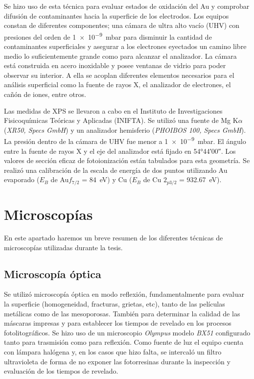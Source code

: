 		Se hizo uso de esta técnica para evaluar estados de oxidación del Au y comprobar difusión de contaminantes hacia la superficie de los electrodos.  Los equipos constan de diferentes componentes; una cámara de ultra alto vacío (UHV) con presiones del orden de \SI{1e-9}{mbar} para disminuir la cantidad de contaminantes superficiales y asegurar a los electrones eyectados un camino libre medio lo suficientemente grande como para alcanzar el analizador. La cámara está construida en acero inoxidable y posee ventanas de vidrio para poder observar su interior. A ella se acoplan diferentes elementos necesarios para el análisis superficial como la fuente de rayos X, el analizador de electrones, el cañón de iones, entre otros.\cite{XPS1978,Corthey2012}

		Las medidas de XPS se llevaron a cabo en el Instituto de Investigaciones Fisicoquímicas Teóricas y Aplicadas (INIFTA). Se utilizó una fuente de Mg K$\alpha$ (\textit{XR50, Specs GmbH}) y un analizador hemisferio (\textit{PHOIBOS 100, Specs GmbH}). La presión dentro de la cámara de UHV fue menor a \SI{1e-9}{mbar}. El ángulo entre la fuente de rayos X y el eje del analizador está fijado en \ang{54;44;00}. Los valores de sección eficaz de fotoionización están tabulados para esta geometría. Se realizó una calibración de la escala de energía de dos puntos utilizando Au evaporado ($E_B$ de Au$f_{7/2}$ = \SI{84}{\electronvolt}) y Cu ($E_B$ de Cu $2_{p3/2}$ = \SI{932.67}{\electronvolt}).
		
\vspace*{-0.2cm}\section{Microscopías}\label{sec:micros}
		
	 En este apartado haremos un breve resumen de los diferentes técnicas de microscopías utilizadas durante la tesis.

	\subsection{Microscopía óptica}

		Se utilizó microscopía óptica en modo reflexión, fundamentalmente para evaluar la superficie (homogeneidad, fracturas, grietas, etc), tanto de las películas metálicas como de las mesoporosas. También para determinar la calidad de las máscaras impresas y para establecer los tiempos de revelado en los procesos fotolitográficos. Se hizo uso de un microscopio \textit{Olympus} modelo \textit{BX51} configurado tanto para trasmisión como para reflexión. Como fuente de luz el equipo cuenta con lámpara halógena y, en los casos que hizo falta, se intercaló un filtro ultravioleta de forma de no exponer las fotorresinas durante la inspección y evaluación de los tiempos de revelado.
	
